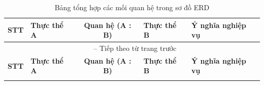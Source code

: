 \begin{longtable}{|c|l|c|l|p{6cm}|}
\caption{Bảng tổng hợp các mối quan hệ trong sơ đồ ERD} \label{tab:erd_relationships} \\
\hline
\textbf{STT} & \textbf{Thực thể A} & \textbf{Quan hệ (A : B)} & \textbf{Thực thể B} & \textbf{Ý nghĩa nghiệp vụ} \\ \hline
\endfirsthead

\multicolumn{5}{c}{{\tablename\ \thetable{} -- Tiếp theo từ trang trước}} \\
\hline
\textbf{STT} & \textbf{Thực thể A} & \textbf{Quan hệ (A : B)} & \textbf{Thực thể B} & \textbf{Ý nghĩa nghiệp vụ} \\ \hline
\endhead

\hline
\endfoot

\hline
\endlastfoot


\end{longtable}
